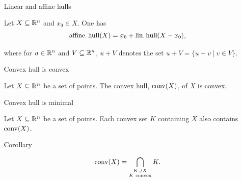 \begin{frame}{Linear and affine hulls}


\begin{theorem}
  \label{conv:prop:1}
  Let $X\subseteq\mathbb{R}^n$ and $x_0\in X$. One has 
  \begin{displaymath}
    \operatorname{\mathrm{affine.hull}}(X) = x_0 + \operatorname{\mathrm{lin.hull}}(X - x_0),
  \end{displaymath}
 
\end{theorem}

\bigskip
 where for $u \in \mathbb{R}^n$ and $V\subseteq\mathbb{R}^n$,   $u +V$ denotes the set
  $u+V = \{ u+v \mid v \in V\}$.
  
\end{frame}


\begin{frame}
  
\end{frame}

\begin{frame}
  
\end{frame}

\begin{frame}{Convex hull is convex}


\begin{theorem}
  \label{conv:thr:1}
  Let $X\subseteq\mathbb{R}^n$ be a set of points. The convex hull, $\operatorname{\mathrm{conv}}(X)$,  of $X$
  is convex. 
\end{theorem}

  
\end{frame}


\begin{frame}
  
\end{frame}

\begin{frame}{Convex hull is minimal}


\begin{theorem}
  \label{conv:thr:2}
  Let $X\subseteq\mathbb{R}^n$ be a set of points. Each convex set $K$ containing $X$
  also contains $\operatorname{\mathrm{conv}}(X)$. 
\end{theorem}
  
\end{frame}



\begin{frame}
  
\end{frame}


\begin{frame}{Corollary}


\begin{displaymath}
  \operatorname{\mathrm{conv}}(X) = \bigcap_{\substack{K \supseteq X\\ K \text{  convex}}} K. 
\end{displaymath}
\end{frame}



